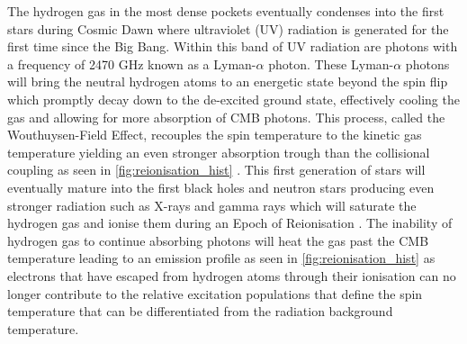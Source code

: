 The hydrogen gas in the most dense pockets eventually condenses into the first stars during Cosmic Dawn where ultraviolet (UV) radiation is generated for the first time since the Big Bang. Within this band of UV radiation are photons with a frequency of 2470 GHz known as a Lyman-$\alpha$ photon. These Lyman-$\alpha$ photons will bring the neutral hydrogen atoms to an energetic state beyond the spin flip which promptly decay down to the de-excited ground state, effectively cooling the gas and allowing for more absorption of CMB photons. This process, called the Wouthuysen-Field Effect, recouples the spin temperature to the kinetic gas temperature yielding an even stronger absorption trough than the collisional coupling as seen in \cref{fig:reionisation_hist} \citep{wouthuysen,field}. This first generation of stars will eventually mature into the first black holes and neutron stars producing even stronger radiation such as X-rays and gamma rays which will saturate the hydrogen gas and ionise them during an Epoch of Reionisation \citep{liuData}. The inability of hydrogen gas to continue absorbing photons will heat the gas past the CMB temperature leading to an emission profile as seen in \cref{fig:reionisation_hist} as electrons that have escaped from hydrogen atoms through their ionisation can no longer contribute to the relative excitation populations that define the spin temperature that can be differentiated from the radiation background temperature.

